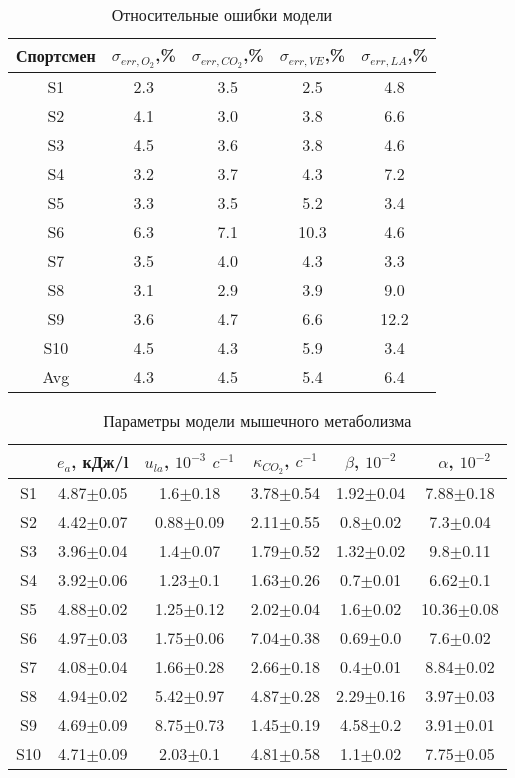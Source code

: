 \begin{table}[!ht]
\centering
\caption{Относительные ошибки модели}
\medskip
\label{tabular:tab3}
\begin{tabular}{|c|c|c|c|c|}
\hline
Спортсмен & \(\sigma_{err,O_{2}}\),\%  & \(\sigma_{err,CO_{2}}\),\% & \(\sigma_{err,VE}\),\% & \(\sigma_{err,LA}\),\%\\
\hline
S1 & 2.3 & 3.5 & 2.5 & 4.8 \\
\hline
S2 & 4.1 & 3.0 & 3.8 & 6.6 \\
\hline
S3 & 4.5 & 3.6 & 3.8 & 4.6  \\
\hline
S4 & 3.2 & 3.7 & 4.3 & 7.2  \\
\hline
S5 & 3.3 & 3.5 & 5.2 & 3.4  \\
\hline
S6 & 6.3 & 7.1 & 10.3 & 4.6  \\
\hline
S7 & 3.5 & 4.0 & 4.3 & 3.3  \\
\hline
S8 & 3.1 & 2.9 & 3.9 & 9.0  \\
\hline
S9 & 3.6 & 4.7 & 6.6 & 12.2  \\
\hline
S10 & 4.5 & 4.3 & 5.9 & 3.4  \\
\hline
Avg & 4.3 & 4.5 & 5.4 & 6.4  \\
\hline
\end{tabular}
\end{table}

\begin{table}[!ht]
\centering
\caption{Параметры модели мышечного метаболизма}
\medskip
\label{tabular:tab4}
\begin{tabular}{|c|c|c|c|c|c|}
\hline
 & \(e_{a}\), кДж/l & \(u_{la}\), $10^{-3}$ $c^{-1}$ & \(\kappa_{CO_{2}}\), $c^{-1}$ & $\beta$, $10^{-2}$ & \ $\alpha$, $10^{-2}$ \\
\hline 
S1 & 4.87$\pm$0.05 & 1.6$\pm$0.18 & 3.78$\pm$0.54 & 1.92$\pm$0.04 & 7.88$\pm$0.18   \\  \hline 
S2 & 4.42$\pm$0.07 & 0.88$\pm$0.09 & 2.11$\pm$0.55 & 0.8$\pm$0.02 & 7.3$\pm$0.04   \\  \hline 
S3 & 3.96$\pm$0.04 & 1.4$\pm$0.07 & 1.79$\pm$0.52 & 1.32$\pm$0.02 & 9.8$\pm$0.11   \\  \hline 
S4 & 3.92$\pm$0.06 & 1.23$\pm$0.1 & 1.63$\pm$0.26 & 0.7$\pm$0.01 & 6.62$\pm$0.1   \\  \hline 
S5 & 4.88$\pm$0.02 & 1.25$\pm$0.12 & 2.02$\pm$0.04 & 1.6$\pm$0.02 & 10.36$\pm$0.08   \\  \hline 
S6 & 4.97$\pm$0.03 & 1.75$\pm$0.06 & 7.04$\pm$0.38 & 0.69$\pm$0.0 & 7.6$\pm$0.02   \\  \hline 
S7 & 4.08$\pm$0.04 & 1.66$\pm$0.28 & 2.66$\pm$0.18 & 0.4$\pm$0.01 & 8.84$\pm$0.02   \\  \hline 
S8 & 4.94$\pm$0.02 & 5.42$\pm$0.97 & 4.87$\pm$0.28 & 2.29$\pm$0.16 & 3.97$\pm$0.03   \\  \hline 
S9 & 4.69$\pm$0.09 & 8.75$\pm$0.73 & 1.45$\pm$0.19 & 4.58$\pm$0.2 & 3.91$\pm$0.01   \\  \hline
S10 & 4.71$\pm$0.09 & 2.03$\pm$0.1 & 4.81$\pm$0.58 & 1.1$\pm$0.02 & 7.75$\pm$0.05   \\  
\hline 
\end{tabular}
\end{table}


